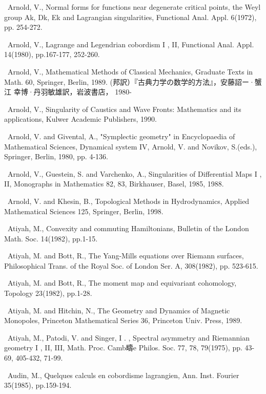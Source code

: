 {\noindent [11]\ Arnold, V., Normal forms for functions near degenerate critical points, the Weyl group Ak, Dk, Ek and Lagrangian singularities, Functional Anal. Appl. 6(1972), pp. 254-272.\par\smallskip
\noindent [12]\ Arnold, V., Lagrange and Legendrian cobordism I , II, Functional Anal. Appl. 14(1980), pp.167-177, 252-260.\par\smallskip
\noindent [13]\ Arnold, V., Mathematical Methods of Classical Mechanics, Graduate Texts in Math. 60, Springer, Berlin, 1989. (邦訳）『古典力学の数学的方法』，安藤詔ー·蟹江 幸博·丹羽敏雄訳，岩波書店， 1980-\par\smallskip
\noindent [14]\ Arnold, V., Singularity of Caustics and Wave Fronts: Mathematics and its applications, Kulwer Academic Publishers, 1990.\par\smallskip
\noindent [15]\ Arnold, V. and Givental, A., "Symplectic geometry" in Encyclopaedia of Mathematical Sciences, Dynamical system IV, Arnold, V. and Novikov, S.(eds.), Springer, Berlin, 1980, pp. 4-136.\par\smallskip
\noindent [16]\ Arnold, V., Guestein, S. and Varchenko, A., Singularities of Differential Maps I , II, Monographs in Mathematics 82, 83, Birkhauser, Basel, 1985, 1988.\par\smallskip
\noindent [17]\ Arnold, V. and Khesin, B., Topological Methods in Hydrodynamics, Applied Mathematical Sciences 125, Springer, Berlin, 1998.\par\smallskip
\noindent [18]\ Atiyah, M., Convexity and commuting Hamiltonians, Bulletin of the London Math. Soc. 14(1982), pp.1-15.\par\smallskip
\noindent [19]\ Atiyah, M. and Bott, R., The Yang-Mills equations over Riemann surfaces, Philosophical Trans. of the Royal Soc. of London Ser. A, 308(1982), pp. 523-615.\par\smallskip
\noindent [20]\ Atiyah, M. and Bott, R., The moment map and equivariant cohomology, Topology 23(1982), pp.1-28.\par\smallskip
\noindent [21]\ Atiyah, M. and Hitchin, N., The Geometry and Dynamics of Magnetic Monopoles, Princeton Mathematical Series 36, Princeton Univ. Press, 1989.\par\smallskip
\noindent [22]\ Atiyah, M., Patodi, V. and Singer, I . , Spectral asymmetry and Riemannian geometry I , II, III, Math. Proc. Camb疇e Philos. Soc. 77, 78, 79(1975), pp. 43-69, 405-432, 71-99.\par\smallskip
\noindent [23]\ Audin, M., Quelques calculs en cobordisme lagrangien, Ann. Inst. Fourier 35(1985), pp.159-194.\par\smallskip
}
